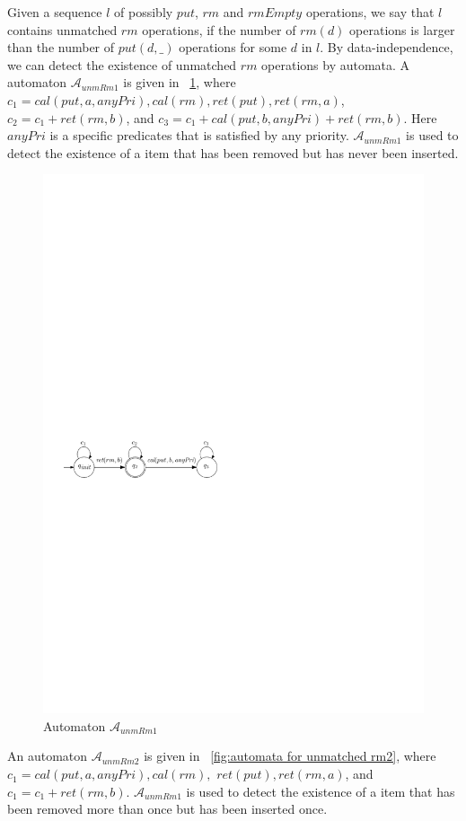 \documentclass{llncs}
\begin{document}
Given a sequence $l$ of possibly $\textit{put}$, $\textit{rm}$ and $\textit{rmEmpty}$ operations, we say that $l$ contains unmatched $\textit{rm}$ operations, if the number of $\textit{rm}(d)$ operations is larger than the number of $\textit{put}(d,\_)$ operations for some $d$ in $l$. By data-independence, we can detect the existence of unmatched $\textit{rm}$ operations by automata. A automaton $\mathcal{A}_{\textit{unmRm1}}$ is given in \figurename~\ref{fig:automata for unmatched rm1}, where $c_1=\textit{cal}(\textit{put},a,\textit{anyPri}),\textit{cal}(rm),\textit{ret}(\textit{put}),\textit{ret}(\textit{rm},a)$, $c_2=c_1 + \textit{ret}(\textit{rm},b)$, and $c_3 = c_1 + \textit{cal}(\textit{put},b,\textit{anyPri}) + \textit{ret}(\textit{rm},b)$. Here $\textit{anyPri}$ is a specific predicates that is satisfied by any priority. $\mathcal{A}_{\textit{unmRm1}}$ is used to detect the existence of a item that has been removed but has never been inserted.

\begin{figure}[htbp]
  \centering
  \includegraphics[width=0.5 \textwidth]{PIC_AUTO_UNMATCHED_RM1.pdf}
  \caption{Automaton $\mathcal{A}_{\textit{unmRm1}}$}
  \label{fig:automata for unmatched rm1}
\end{figure}

An automaton $\mathcal{A}_{\textit{unmRm2}}$ is given in \figurename~\ref{fig:automata for unmatched rm2}, where $c_1 = \textit{cal}(\textit{put},a,\textit{anyPri}),\textit{cal}(rm),$ $\textit{ret}(\textit{put}),\textit{ret}(\textit{rm},a)$, and $c_1 = c_1 + \textit{ret}(\textit{rm},b)$.  $\mathcal{A}_{\textit{unmRm1}}$ is used to detect the existence of a item that has been removed more than once but has been inserted once.
\end{document}
